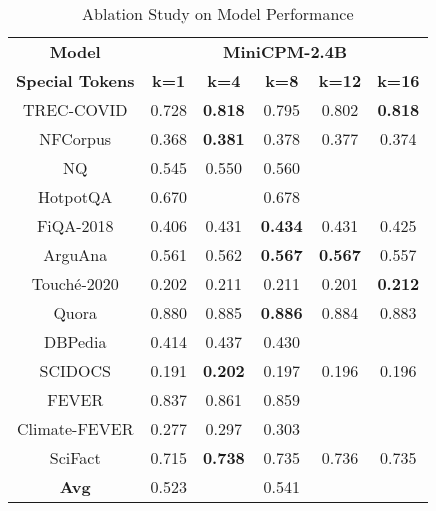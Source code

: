 \begin{table*}[ht]
    \centering
    
    \label{tab:ablation_study}
    \begin{tabular}{l|c|c|c|c|c}
        \toprule
        \multicolumn{1}{c|}{\textbf{Model}} & \multicolumn{5}{c}{\textbf{MiniCPM-2.4B}} \\
        \cmidrule(lr){2-6}
        
        \textbf{Special Tokens} & \textbf{k=1} & \textbf{k=4} & \textbf{k=8} & \textbf{k=12} & \textbf{k=16} \\
        \midrule
        \multicolumn{1}{c|}{TREC-COVID} &0.728& \textbf{0.818} & 0.795 &0.802  &\textbf{0.818}    \\
        \multicolumn{1}{c|}{NFCorpus} &0.368& \textbf{0.381} & 0.378 & 0.377 &0.374  \\
        \multicolumn{1}{c|}{NQ} &0.545&0.550& 0.560 & &  \\
        \multicolumn{1}{c|}{HotpotQA} &0.670& & 0.678 & &  \\
        \multicolumn{1}{c|}{FiQA-2018} &0.406& 0.431 & \textbf{0.434} & 0.431 &0.425   \\
        \multicolumn{1}{c|}{ArguAna} &0.561& 0.562 & \textbf{0.567} & \textbf{0.567} &0.557   \\
        \multicolumn{1}{c|}{Touché-2020} &0.202& 0.211 & 0.211 &0.201  & \textbf{0.212}   \\
        \multicolumn{1}{c|}{Quora} &0.880& 0.885 & \textbf{0.886} & 0.884 &0.883  \\
        \multicolumn{1}{c|}{DBPedia} &0.414&0.437 & 0.430 &  &  \\
        \multicolumn{1}{c|}{SCIDOCS} &0.191& \textbf{0.202} & 0.197 & 0.196  &0.196\\
        \multicolumn{1}{c|}{FEVER} &0.837&0.861 & 0.859 &   &   \\
        \multicolumn{1}{c|}{Climate-FEVER} &0.277&0.297 & 0.303 &  &   \\
        \multicolumn{1}{c|}{SciFact}&0.715& \textbf{0.738} & 0.735 & 0.736  &0.735  \\
        \midrule
        \multicolumn{1}{c|}{\textbf{Avg}}  &0.523& & 0.541 &  & \\
        \bottomrule
    \end{tabular}
    \caption{Ablation Study on Model Performance}
    \footnotesize
\end{table*}